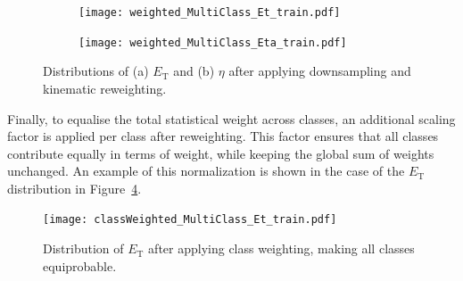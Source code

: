 \begin{figure}[htbp]
  \centering
  \begin{subfigure}[b]{0.48\textwidth}
      \centering
      \texttt{[image: weighted\_MultiClass\_Et\_train.pdf]}
      \caption{}
      \label{fig:et_reweighted}
  \end{subfigure}
  \hfill
  \begin{subfigure}[b]{0.48\textwidth}
      \centering
      \texttt{[image: weighted\_MultiClass\_Eta\_train.pdf]}
      \caption{}
      \label{fig:eta_reweighted}
  \end{subfigure}
  \caption{Distributions of (a) $E_{\text{T}}$ and (b) $\eta$ after applying downsampling and kinematic reweighting.}
  \label{fig:et_eta_reweighted}
\end{figure}

Finally, to equalise the total statistical weight across classes, an additional scaling factor is applied per class after reweighting. This factor ensures that all classes contribute equally in terms of weight, while keeping the global sum of weights unchanged. An example of this normalization is shown in the case of the $E_{\text{T}}$ distribution in Figure~\ref{fig:et_classWeighted}.

\begin{figure}[htbp]
  \centering
  \texttt{[image: classWeighted\_MultiClass\_Et\_train.pdf]}
  \caption{Distribution of $E_{\text{T}}$ after applying class weighting, making all classes equiprobable.}
  \label{fig:et_classWeighted}
\end{figure}


